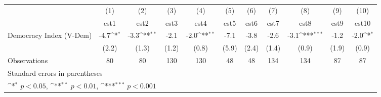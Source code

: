 {
\def\sym#1{\ifmmode^{#1}\else\(^{#1}\)\fi}
\begin{tabular}{l*{10}{c}}
\hline\hline
                    &\multicolumn{1}{c}{(1)}         &\multicolumn{1}{c}{(2)}         &\multicolumn{1}{c}{(3)}         &\multicolumn{1}{c}{(4)}         &\multicolumn{1}{c}{(5)}         &\multicolumn{1}{c}{(6)}         &\multicolumn{1}{c}{(7)}         &\multicolumn{1}{c}{(8)}         &\multicolumn{1}{c}{(9)}         &\multicolumn{1}{c}{(10)}         \\
                    &        est1         &        est2         &        est3         &        est4         &        est5         &        est6         &        est7         &        est8         &        est9         &       est10         \\
\hline
Democracy Index (V-Dem)&        -4.7\sym{*}  &        -3.3\sym{**} &        -2.1         &        -2.0\sym{**} &        -7.1         &        -3.8         &        -2.6         &        -3.1\sym{***}&        -1.2         &        -2.0\sym{*}  \\
                    &       (2.2)         &       (1.3)         &       (1.2)         &       (0.8)         &       (5.9)         &       (2.4)         &       (1.4)         &       (0.9)         &       (1.9)         &       (0.9)         \\
\hline
Observations        &          80         &          80         &         130         &         130         &          48         &          48         &         134         &         134         &          87         &          87         \\
\hline\hline
\multicolumn{11}{l}{\footnotesize Standard errors in parentheses}\\
\multicolumn{11}{l}{\footnotesize \sym{*} \(p<0.05\), \sym{**} \(p<0.01\), \sym{***} \(p<0.001\)}\\
\end{tabular}
}
